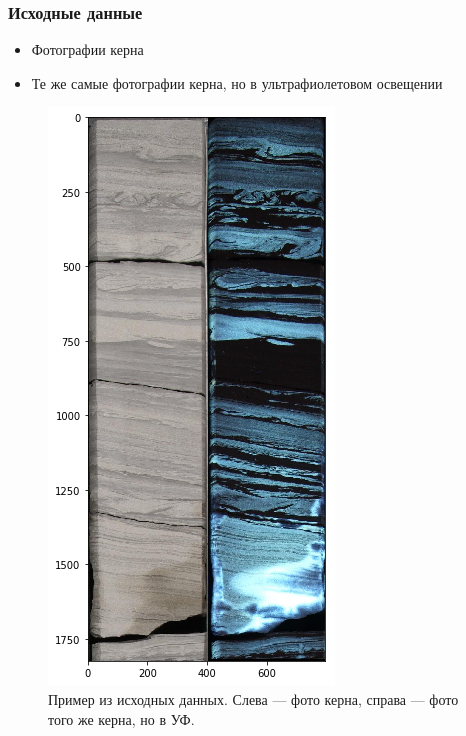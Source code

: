 \documentclass[xetex,mathserif,serif]{beamer}
\begin{document}
	
	\begin{frame}
		\frametitle{Исходные данные}

        \begin{itemize}
            \item Фотографии керна
            \item Те же самые фотографии керна, но в ультрафиолетовом освещении
        \end{itemize} 
    
        \begin{figure}[h]
            \centering
            \includegraphics[scale=0.2]{images/sample.png}
            \caption{Пример из исходных данных. Слева — фото керна, справа — фото того же керна, но в УФ.}
            \label{sample}
        \end{figure}       
    
	\end{frame}		
	
\end{document}
